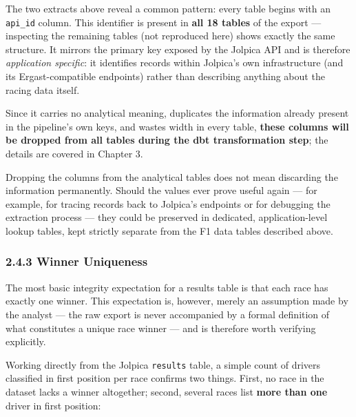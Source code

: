 \documentclass[
]{article}
\begin{document}
The two extracts above reveal a common pattern: every table begins with
an \texttt{api\_id} column. This identifier is present in \textbf{all 18
tables} of the export --- inspecting the remaining tables (not
reproduced here) shows exactly the same structure. It mirrors the
primary key exposed by the Jolpica API and is therefore
\emph{application specific}: it identifies records within Jolpica's own
infrastructure (and its Ergast-compatible endpoints) rather than
describing anything about the racing data itself.

Since it carries no analytical meaning, duplicates the information
already present in the pipeline's own keys, and wastes width in every
table, \textbf{these columns will be dropped from all tables during the
dbt transformation step}; the details are covered in Chapter 3.

Dropping the columns from the analytical tables does not mean discarding
the information permanently. Should the values ever prove useful again
--- for example, for tracing records back to Jolpica's endpoints or for
debugging the extraction process --- they could be preserved in
dedicated, application-level lookup tables, kept strictly separate from
the F1 data tables described above.

\newpage

\subsubsection{2.4.3 Winner Uniqueness}\label{winner-uniqueness}

The most basic integrity expectation for a results table is that each
race has exactly one winner. This expectation is, however, merely an
assumption made by the analyst --- the raw export is never accompanied
by a formal definition of what constitutes a unique race winner --- and
is therefore worth verifying explicitly.

Working directly from the Jolpica \texttt{results} table, a simple count
of drivers classified in first position per race confirms two things.
First, no race in the dataset lacks a winner altogether; second, several
races list \textbf{more than one} driver in first position:

\begin{table}[!h]
\centering\begingroup\fontsize{8}{10}\selectfont

\endgroup{}
\end{table}
\end{document}
